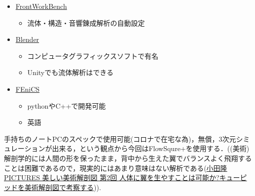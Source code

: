 \begin{itemize}
                \item \href{http://www.cenav.org/kdb/?page_id=334}{FrontWorkBench}
                    \begin{itemize}
                    \item 流体・構造・音響錬成解析の自動設定
                    \end{itemize}
                
                \item \href{https://www.blender.org/download/}{Blender}
                    \begin{itemize}
                    \item コンピュータグラフィックスソフトで有名
                    \item Unityでも流体解析はできる
                    \end{itemize}
        
                \item \href{https://fenicsproject.org/}{FEniCS}
                    \begin{itemize}
                    \item pythonやC++で開発可能
                    \item 英語
                    \end{itemize}
                
                \end{itemize}
        
                手持ちのノートPCのスペックで使用可能(コロナで在宅な為)，無償，3次元シミュレーションが出来る，という観点から今回はFlowSqure+を使用する．((美術)解剖学的には人間の形を保ったまま，背中から生えた翼でバランスよく飛翔することは困難であるので，現実的にはあまり意味はない解析である(\href{https://genkosha.pictures/illustration/18103116710}{小田隆 PICTURES 美しい美術解剖図 第2回 人体に翼を生やすことは可能か?キューピッドを美術解剖図で考察する})).
